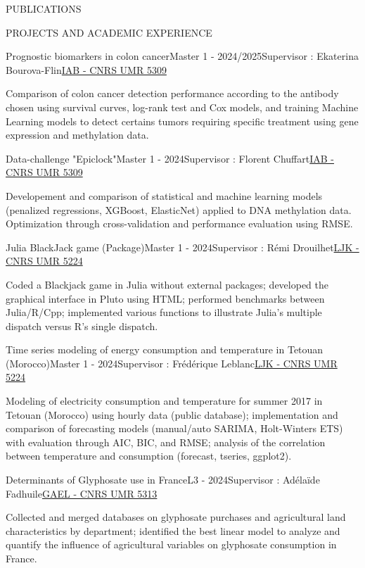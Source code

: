 \documentclass[11pt,a4paper]{resume}
\begin{document}
\begin{rSection}{PUBLICATIONS}
\begin{rSection}{PROJECTS AND ACADEMIC EXPERIENCE}
	\begin{rSubsection}{Prognostic biomarkers in colon cancer}{Master 1 - 2024/2025}{Supervisor : Ekaterina Bourova-Flin}{\href{https://iab-grenoble.fr/}{IAB - CNRS UMR 5309}}
		\item Comparison of colon cancer detection performance according to the antibody chosen using survival curves, log-rank test and Cox models, and training Machine Learning models to detect certains tumors requiring specific treatment using gene expression and methylation data.
	\end{rSubsection}

	\begin{rSubsection}{Data-challenge "Epiclock"}{Master 1 - 2024}{Supervisor : Florent Chuffart}{\href{https://iab-grenoble.fr/}{IAB - CNRS UMR 5309}}
		\item Developement and comparison of statistical and machine learning models (penalized regressions, XGBoost, ElasticNet) applied to DNA methylation data. Optimization through cross-validation and performance evaluation using RMSE.
	\end{rSubsection}

	\begin{rSubsection}{Julia BlackJack game (Package)}{Master 1 - 2024}{Supervisor : Rémi Drouilhet}{\href{https://www-ljk.imag.fr/}{LJK - CNRS UMR 5224}}
		\item Coded a Blackjack game in Julia without external packages; developed the graphical interface in Pluto using HTML; performed benchmarks between Julia/R/Cpp; implemented various functions to illustrate Julia’s multiple dispatch versus R’s single dispatch.
	\end{rSubsection}

	\begin{rSubsection}{Time series modeling of energy consumption and temperature in Tetouan (Morocco)}{Master 1 - 2024}{Supervisor : Frédérique Leblanc}{\href{https://www-ljk.imag.fr/}{LJK - CNRS UMR 5224}}
		\item Modeling of electricity consumption and temperature for summer 2017 in Tetouan (Morocco) using hourly data (public database); implementation and comparison of forecasting models (manual/auto SARIMA, Holt-Winters ETS) with evaluation through AIC, BIC, and RMSE; analysis of the correlation between temperature and consumption (forecast, tseries, ggplot2).
	\end{rSubsection}

	\begin{rSubsection}{Determinants of Glyphosate use in France}{L3 - 2024}{Supervisor : Adélaïde Fadhuile}{\href{https://gael.univ-grenoble-alpes.fr/fr}{GAEL - CNRS UMR 5313}}
		\item Collected and merged databases on glyphosate purchases and agricultural land characteristics by department; identified the best linear model to analyze and quantify the influence of agricultural variables on glyphosate consumption in France.
	\end{rSubsection}


\end{rSection}
\end{rSection}
\end{document}
